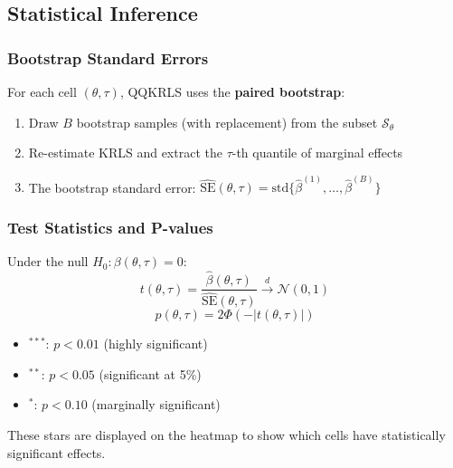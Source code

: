 \subsection{Statistical Inference}

\subsubsection{Bootstrap Standard Errors}

For each cell $(\theta, \tau)$, QQKRLS uses the \textbf{paired bootstrap}:
\begin{enumerate}[leftmargin=2em]
\item Draw $B$ bootstrap samples (with replacement) from the subset $\mathcal{S}_\theta$
\item Re-estimate KRLS and extract the $\tau$-th quantile of marginal effects
\item The bootstrap standard error: $\widehat{\text{SE}}(\theta,\tau) = \text{std}\{\hat{\beta}^{(1)}, \ldots, \hat{\beta}^{(B)}\}$
\end{enumerate}

\subsubsection{Test Statistics and P-values}

Under the null $H_0: \beta(\theta,\tau) = 0$:
\begin{equation}
t(\theta,\tau) = \frac{\hat{\beta}(\theta,\tau)}{\widehat{\text{SE}}(\theta,\tau)} \xrightarrow{d} \mathcal{N}(0,1)
\end{equation}
\begin{equation}
p(\theta,\tau) = 2\Phi\!\left(-|t(\theta,\tau)|\right)
\end{equation}

\begin{tipbox}
\begin{itemize}[leftmargin=1.5em]
\item $^{***}$: $p < 0.01$ (highly significant)
\item $^{**}$: $p < 0.05$ (significant at 5\%)
\item $^{*}$: $p < 0.10$ (marginally significant)
\end{itemize}
These stars are displayed on the heatmap to show which cells have statistically significant effects.
\end{tipbox}
